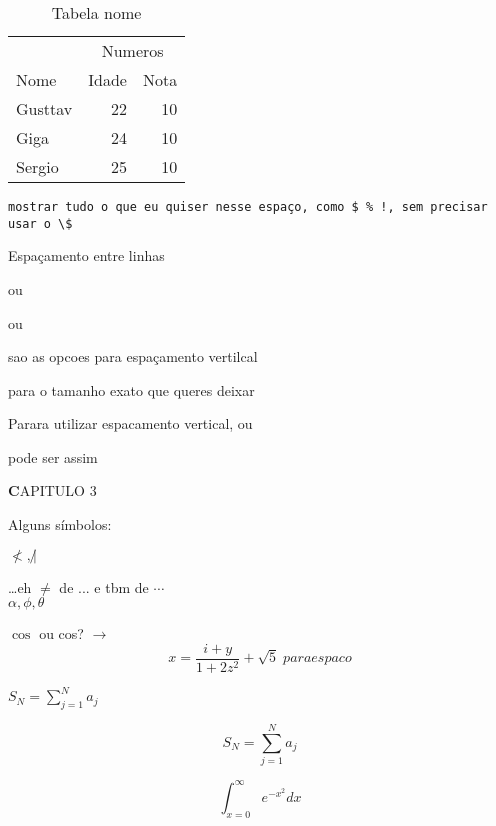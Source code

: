 \documentclass{article}
\begin{document}
\begin{table} [h] %
\begin{center}
\begin{tabular}{|l| |r|r|}
\hline
& \multicolumn{2}{c|}{Numeros}\\
\cline{2-3}
Nome & Idade & Nota\\
\hline
Gusttav & 22 & 10\\
Giga & 24 & 10\\
Sergio & 25 & 10\\
\hline

\end{tabular}
\caption{Tabela nome}\label{tabela}
\end{center}
\end{table}


\begin{verbatim}
mostrar tudo o que eu quiser nesse espaço, como $ % !, sem precisar usar o \$
\end{verbatim}


Espaçamento entre linhas
\bigskip

ou
\medskip

ou
\smallskip

sao as opcoes para espaçamento vertilcal

\vspace{2.2in} para o tamanho exato que queres deixar %

Parara utilizar espacamento \hspace{1cm} vertical, ou

pode ser \hspace{\fill} assim
\vspace{\fill}


\begin{center}
\textbf CAPITULO 3 
\end{center}

Alguns símbolos:

$\not<, \not|$

\ldots eh $\not=$ de ... e tbm de $\cdots$\\
$\alpha,   \phi,   \theta $

$\cos$ ou cos? $\rightarrow$
\[
	x = \frac{i+y}{1+2z^2} + \sqrt{5} \;   para espaco 
\]



$S_N = \sum_{j=1}^N a_j  $

\[
	S_N = \sum_{j=1}^N a_j  
\]

\[
	\int_{x=0}^\infty e^{-x^2} dx
\]
\end{document}
